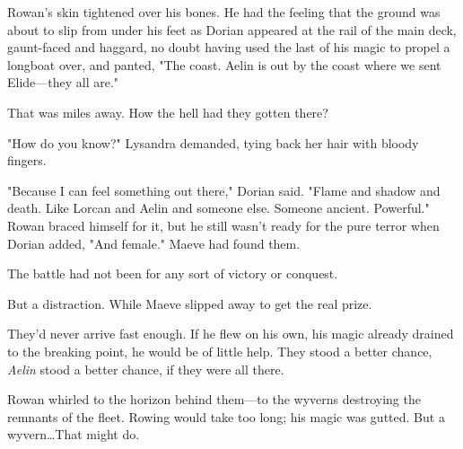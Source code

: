 Rowan's skin tightened over his bones.
He had the feeling that the ground was about to slip from under his feet as Dorian appeared at the rail of the main deck, gaunt-faced and haggard, no doubt having used the last of his magic to propel a longboat over, and panted, "The coast.
Aelin is out by the coast where we sent Elide---they all are."

That was miles away.
How the hell had they gotten there?

"How do you know?"
Lysandra demanded, tying back her hair with bloody fingers.

"Because I can feel something out there," Dorian said.
"Flame and shadow and death.
Like Lorcan and Aelin and someone else.
Someone ancient.
Powerful."
Rowan braced himself for it, but he still wasn't ready for the pure terror when Dorian added, "And female."
Maeve had found them.

The battle had not been for any sort of victory or conquest.

But a distraction.
While Maeve slipped away to get the real prize.

They'd never arrive fast enough.
If he flew on his own, his magic already drained to the breaking point, he would be of little help.
They stood a better chance, \emph{Aelin} stood a better chance, if they were all there.

Rowan whirled to the horizon behind them---to the wyverns destroying the remnants of the fleet.
Rowing would take too long; his magic was gutted.
But a wyvern\ldots That might do.
